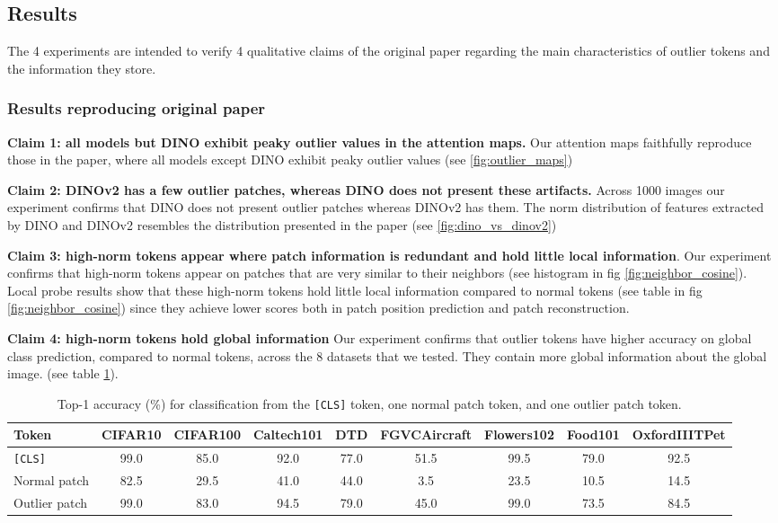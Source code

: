 \subsection{Results}
\label{sec:results}
The 4 experiments are intended to verify 4 qualitative claims of the original paper regarding the main characteristics of outlier tokens and the information they store.

\subsubsection{Results reproducing original paper}

\textbf{Claim 1: all models but DINO exhibit peaky outlier values
in the attention maps.} Our attention maps faithfully reproduce those in the paper, where all models except DINO exhibit peaky outlier values (see \ref{fig:outlier_maps})

\textbf{Claim 2: DINOv2 has a few outlier patches, whereas DINO does not present these artifacts.} Across 1000 images our experiment confirms that DINO does not present outlier patches whereas DINOv2 has them. The norm distribution of features extracted by DINO and DINOv2 resembles the distribution presented in the paper (see \ref{fig:dino_vs_dinov2})

\textbf{Claim 3: high-norm tokens appear where patch information is redundant and hold little local information}. Our experiment confirms that high-norm tokens appear on patches that are very similar to their neighbors (see histogram in fig \ref{fig:neighbor_cosine}). Local probe results show that these high-norm tokens hold little local information compared to normal tokens (see table in fig \ref{fig:neighbor_cosine}) since they achieve lower scores both in patch position prediction and patch reconstruction. 

\textbf{Claim 4: high-norm tokens hold global information}
Our experiment confirms that outlier tokens have higher accuracy on global class prediction, compared to normal tokens, across the 8 datasets that we tested. They contain more global information about the global image. (see table \ref{tab:global-probes}). 

\begin{table}[h]
    \centering
    \footnotesize
    \caption{Top-1 accuracy (\%) for classification from the \texttt{[CLS]} token, one normal patch token, and one outlier patch token.}
    \label{tab:global-probes}
    \begin{tabular}{lcccccccc}
        \toprule
        Token & CIFAR10 & CIFAR100 & Caltech101 & DTD & FGVCAircraft & Flowers102 & Food101 & OxfordIIITPet \\
        \midrule
        \texttt{[CLS]} & 99.0 & 85.0 & 92.0 & 77.0 & 51.5 & 99.5 & 79.0 & 92.5 \\
        Normal patch   & 82.5 & 29.5 & 41.0 & 44.0 & 3.5  & 23.5 & 10.5 & 14.5 \\
        Outlier patch  & 99.0 & 83.0 & 94.5 & 79.0 & 45.0 & 99.0 & 73.5 & 84.5 \\
        \bottomrule
    \end{tabular}
\end{table}


